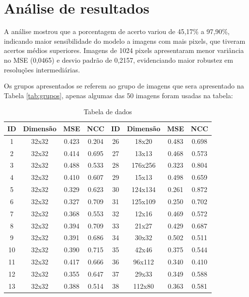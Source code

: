 \section{Análise de resultados}

A análise mostrou que a porcentagem de acerto variou de 45,17\% a 97,90\%, indicando maior sensibilidade do modelo a imagens com mais pixels, que tiveram acertos médios superiores. Imagens de 1024 pixels apresentaram menor variância no MSE (0,0465) e desvio padrão de 0,2157, evidenciando maior robustez em resoluções intermediárias.

Os grupos apresentados se referem ao grupo de imagens que sera apresentado na Tabela \ref{tab:grupos}, apenas algumas das 50 imagens foram usadas na tabela:

\begin{table}[htbp]
    \centering
    \caption{Tabela de dados} %
    \begin{tabular}{|c|c|c|c|c|c|c|c|}
    \hline
    \textbf{ID} & \textbf{Dimensão} & \textbf{MSE} & \textbf{NCC} & \textbf{ID} & \textbf{Dimensão} & \textbf{MSE} & \textbf{NCC} \\ \hline
    1 & 32x32   & 0.423 & 0.204 & 26 & 18x20   & 0.483 & 0.698 \\ 
    2 & 32x32   & 0.414 & 0.695 & 27 & 13x13   & 0.468 & 0.573 \\ 
    3 & 32x32   & 0.488 & 0.533 & 28 & 176x256 & 0.323 & 0.804 \\ 
    4 & 32x32   & 0.410 & 0.607 & 29 & 15x13   & 0.498 & 0.659 \\ 
    5 & 32x32   & 0.329 & 0.623 & 30 & 124x134 & 0.261 & 0.872 \\ 
    6 & 32x32   & 0.327 & 0.709 & 31 & 125x109 & 0.250 & 0.702 \\ 
    7 & 32x32   & 0.368 & 0.553 & 32 & 12x16   & 0.469 & 0.572 \\ 
    8 & 32x32   & 0.394 & 0.709 & 33 & 21x27   & 0.429 & 0.687 \\
    9 & 32x32   & 0.391 & 0.686 & 34 & 30x32   & 0.502 & 0.511 \\ 
    10 & 32x32  & 0.390 & 0.715 & 35 & 42x46   & 0.375 & 0.544 \\
    11 & 32x32  & 0.417 & 0.666 & 36 & 96x112  & 0.340 & 0.410 \\
    12 & 32x32  & 0.355 & 0.647 & 37 & 29x33   & 0.349 & 0.588 \\
    13 & 32x32  & 0.388 & 0.514 & 38 & 112x80  & 0.363 & 0.581 \\

\end{tabular}
\end{table}
